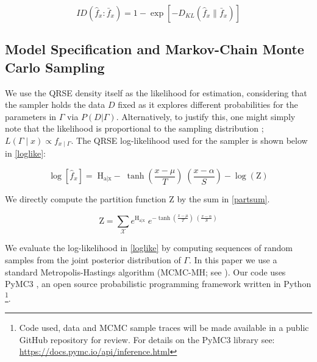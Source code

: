 \medskip 

\begin{equation} \label{soofiq} I D\left(\hat{f}_{x}: \bar{f}_{x}
\right)=1-\exp \left[-D_{K L}\left(\hat{f}_{x} \| \bar{f}_{x}
\right)\right] \end{equation}

\medskip 


\subsection{Model Specification and Markov-Chain Monte Carlo Sampling}
\label{sec-5-2}

We use the QRSE density itself as the likelihood for estimation,
considering that the sampler holds the data $D$ fixed as it explores
different probabilities for the parameters in $\Gamma$ via
$P(D|\Gamma)$. Alternatively, to justify this, one might simply note
that the likelihood is proportional to the sampling distribution ;
$L(\Gamma \mid x) \propto f_{x \mid \Gamma}$. The QRSE log-likelihood used for the sampler is shown below in
\ref{loglike}:


\begin{equation} \label{loglike} \operatorname{log}[\hat{f}_{x}] = \;
\operatorname{H_{a|x}} -\; \operatorname{tanh}\left(
\frac{x-\mu}{T}\right)\;\left(\frac{x-\alpha}{S}\right) -
\operatorname{log}\left(\mathrm{Z}\right) \end{equation}


\medskip 


We directly compute the partition function $\mathrm{Z}$ by the sum in \ref{partsum}. 

\begin{equation} \label{partsum}
\mathrm{Z} = \sum \limits_{\mathcal{X}} e^{\operatorname{H_{a|x}}}\;e^{-\operatorname{tanh}\left( \frac{x-\mu}{T}\right)\;\left(\frac{x-\alpha}{S}\right)}
\end{equation}


\medskip 

We evaluate the log-likelihood in \ref{loglike} by computing sequences
of random samples from the joint posterior distribution of
$\Gamma$. In this paper we use a standard Metropolis-Hastings
algorithm (MCMC-MH; see \citet{hogg2018data}).  Our code uses PyMC3 \citep{salvatier_probabilistic_2015}, an open source probabilistic programming
framework written in Python \footnote{Code used, data and MCMC
sample traces will be made available in a
public GitHub repository for review. For details on the PyMC3 library
see: \url{https://docs.pymc.io/api/inference.html}}. 


